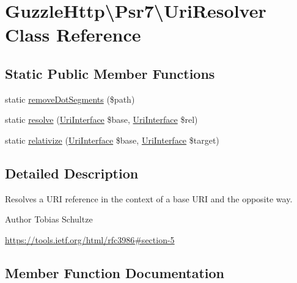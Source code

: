 \hypertarget{classGuzzleHttp_1_1Psr7_1_1UriResolver}{}\section{Guzzle\+Http\textbackslash{}Psr7\textbackslash{}Uri\+Resolver Class Reference}
\label{classGuzzleHttp_1_1Psr7_1_1UriResolver}
\subsection*{Static Public Member Functions}
\begin{DoxyCompactItemize}
\item 
static \hyperlink{classGuzzleHttp_1_1Psr7_1_1UriResolver_a9a9fc1515e4db2b3fcb089190c04c731}{remove\+Dot\+Segments} (\$path)
\item 
static \hyperlink{classGuzzleHttp_1_1Psr7_1_1UriResolver_aa92dccd83431979e6adbd2788af77941}{resolve} (\hyperlink{interfacePsr_1_1Http_1_1Message_1_1UriInterface}{Uri\+Interface} \$base, \hyperlink{interfacePsr_1_1Http_1_1Message_1_1UriInterface}{Uri\+Interface} \$rel)
\item 
static \hyperlink{classGuzzleHttp_1_1Psr7_1_1UriResolver_a4e010e1e3e5349f75704445456c549da}{relativize} (\hyperlink{interfacePsr_1_1Http_1_1Message_1_1UriInterface}{Uri\+Interface} \$base, \hyperlink{interfacePsr_1_1Http_1_1Message_1_1UriInterface}{Uri\+Interface} \$target)
\end{DoxyCompactItemize}


\subsection{Detailed Description}
Resolves a U\+RI reference in the context of a base U\+RI and the opposite way.

\begin{DoxyAuthor}{Author}
Tobias Schultze
\end{DoxyAuthor}
\hyperlink{}{https\+://tools.\+ietf.\+org/html/rfc3986\#section-\/5}

\subsection{Member Function Documentation}
\mbox{\label{classGuzzleHttp_1_1Psr7_1_1UriResolver_a4e010e1e3e5349f75704445456c549da}} 
